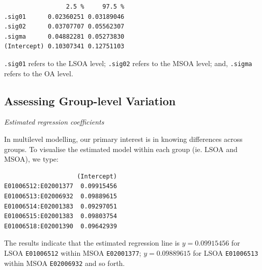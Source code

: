 \documentclass[
  letterpaper,
  DIV=11,
  numbers=noendperiod,
  oneside]{scrreprt}
\newenvironment{Shaded}{\begin{snugshade}}{\end{snugshade}}
\newcommand{\DecValTok}[1]{\textcolor[rgb]{0.68,0.00,0.00}{#1}}
\newcommand{\FunctionTok}[1]{\textcolor[rgb]{0.28,0.35,0.67}{#1}}
\newcommand{\NormalTok}[1]{\textcolor[rgb]{0.00,0.23,0.31}{#1}}
\newcommand{\OtherTok}[1]{\textcolor[rgb]{0.00,0.23,0.31}{#1}}
\newcommand{\SpecialCharTok}[1]{\textcolor[rgb]{0.37,0.37,0.37}{#1}}
\begin{document}
\begin{verbatim}
                 2.5 %     97.5 %
.sig01      0.02360251 0.03189046
.sig02      0.03707707 0.05562307
.sigma      0.04882281 0.05273830
(Intercept) 0.10307341 0.12751103
\end{verbatim}

\texttt{.sig01} refers to the LSOA level; \texttt{.sig02} refers to the
MSOA level; and, \texttt{.sigma} refers to the OA level.

\subsection{Assessing Group-level
Variation}\label{assessing-group-level-variation}

\emph{Estimated regression coefficients}

In multilevel modelling, our primary interest is in knowing differences
across groups. To visualise the estimated model within each group (ie.
LSOA and MSOA), we type:

\begin{Shaded}
\end{Shaded}

\begin{verbatim}
                    (Intercept)
E01006512:E02001377  0.09915456
E01006513:E02006932  0.09889615
E01006514:E02001383  0.09297051
E01006515:E02001383  0.09803754
E01006518:E02001390  0.09642939
\end{verbatim}

The results indicate that the estimated regression line is
\(y = 0.09915456\) for LSOA \texttt{E01006512} within MSOA
\texttt{E02001377}; \(y = 0.09889615\) for LSOA \texttt{E01006513}
within MSOA \texttt{E02006932} and so forth.

\end{document}
